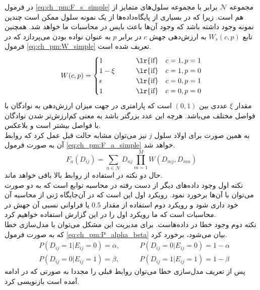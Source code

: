 در فرمول \ref{eq:ch_pm:F_s_simple} مجموعه $\mathcal{N}$ برابر با مجموعه سلول‌های متمایز از هم است. زیرا که در بسیاری از پایگاه‌داده‌ها از یک نمونه سلول ممکن است چندین نمونه وجود داشته باشد که وجود آن‌ها باعث بایس در محاسبات ما خواهد شد. همچنین تابع $W_s(c,p)$ به ارزش‌دهی جهش $c$ در برابر $p$ به عنوان نواده بودن می‌پردازد که در فرمول \ref{eq:ch_pm:W_simple} تعریف شده است.
\begin{equation}
	W(c, p) = 
	\begin{cases}
		1 	       &\qquad \text{\lr{if}} \quad c=1, p=1 \\
		1-\xi   &\qquad \text{\lr{if}} \quad c=1, p=0 \\
		\epsilon &\qquad \text{\lr{if}} \quad c=0, p=1 \\
		1 	 	  &\qquad \text{\lr{if}} \quad c=0, p=0
	\end{cases}
	\label{eq:ch_pm:W_simple}
\end{equation}
مقدار $\xi$ عددی بین $(0,1)$ است که پارامتری در جهت میزان ارزش‌دهی به نوادگان با فواصل مختلف می‌باشد. هرچه این عدد بزرگتر باشد به معنی کم‌ارزش‌تر شدن نوادگان با فواصل بیشتر است و بلاعکس.
\\
به همین صورت برای اولاد سلول $j$ نیز می‌توان مشابه حالت قبل عمل کرد که روابط آن به صورت فرمول‌ \ref{eq:ch_pm:F_a_simple} خواهد شد.
\begin{equation}
	F_a(D_{ij}) = \sum_{n \in \mathcal{N}}  D_{nj}  \prod_{m=1}^{M} W(D_{mj}, D_{mn})
	\label{eq:ch_pm:F_a_simple}
\end{equation}
حال دو نکته در استفاده از روابط بالا باقی خواهد ماند. 
\\
نکته اول وجود داده‌های دیگر از دست رفته در محاسبه توابع است که به دو صورت می‌توان با آن‌ها برخورد  نمود. رویکرد اول این است که در آن‌جایگاه ژنی از محاسبه آن خود داری شود و رویکرد دوم استفاده از مقدار $0.5$ یا فراوانی نسبی آن جهش در محاسبات است که ما رویکرد اول را در این گزارش استفاده خواهیم کرد.
\\
نکته دوم وجود خطا در داده‌هاست. برای مدیریت این مشکل می‌توان با مدل‌سازی خطا که به صورت فرمول \ref{eq:ch_pm:P_alpha_beta} بیان می‌شود، برخورد کرد.
\begin{equation}
	\begin{aligned}
		&P(D_{ij}=1|E_{ij}=0)=\alpha, &\qquad P(D_{ij}=0|E_{ij}=0)=1-\alpha \\ &P(D_{ij}=0|E_{ij}=1)=\beta, &\qquad P(D_{ij}=1|E_{ij}=1)=1-\beta
	\end{aligned}
	\label{eq:ch_pm:P_alpha_beta}
\end{equation}
پس از تعریف مدل‌سازی خطا می‌توان روابط قبلی را مجددا به صورتی که در ادامه آمده است بازنویسی کرد.
